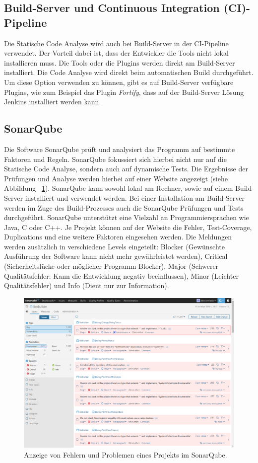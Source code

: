\subsection{Build-Server und Continuous Integration (CI)-Pipeline}
Die Statische Code Analyse wird auch bei Build-Server in der CI-Pipeline verwendet. \parencite{zampetti2017open} Der Vorteil dabei ist, dass der Entwickler die Tools nicht lokal installieren muss. Die Tools oder die Plugins werden direkt am Build-Server installiert. Die Code Analyse wird direkt beim automatischen Build durchgeführt. Um diese Option verwenden zu können, gibt es auf Build-Server verfügbare Plugins, wie zum Beispiel das Plugin \textit{Fortify}, dass auf der Build-Server Lösung Jenkins installiert werden kann.
\subsection{SonarQube}
Die Software SonarQube prüft und analysiert das Programm auf bestimmte Faktoren und Regeln. SonarQube fokussiert sich hierbei nicht nur auf die Statische Code Analyse, sondern auch auf dynamische Tests. Die Ergebnisse der Prüfungen und Analyse werden hierbei auf einer Website angezeigt (siehe Abbildung ~\ref{fig:sonarQube}). SonarQube kann sowohl lokal am Rechner, sowie auf einem Build-Server installiert und verwendet werden. Bei einer Installation am Build-Server werden im Zuge des Build-Prozesses auch die SonarQube Prüfungen und Tests durchgeführt. SonarQube unterstützt eine Vielzahl an Programmiersprachen wie Java, C oder C++. Je Projekt können auf der Website die Fehler, Test-Coverage, Duplications und eine weitere Faktoren eingesehen werden. Die Meldungen werden zusätzlich in verschiedene Levels eingeteilt: Blocker (Gewünschte Ausführung der Software kann nicht mehr gewährleistet werden), Critical (Sicherheitslücke oder möglicher Programm-Blocker), Major (Schwerer Qualitätsfehler: Kann die Entwicklung negativ beeinflussen), Minor (Leichter Qualitätsfehler) und Info (Dient nur zur Information). \parencite{sonarQubeHeise}

\begin{figure}[tp]
  \centering
  \includegraphics[height=8cm]{images/sonarQube.PNG}
 \caption[Anzeige von Fehlern und Problemen eines Projekts im SonarQube]{Anzeige von Fehlern und Problemen eines Projekts im SonarQube.}
  \label{fig:sonarQube}
\end{figure}

